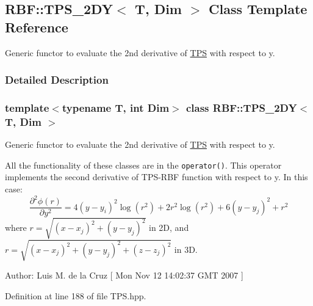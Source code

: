 \hypertarget{classRBF_1_1TPS__2DY}{
\subsection{RBF::TPS\_\-2DY$<$ T, Dim $>$ Class Template Reference}
\label{classRBF_1_1TPS__2DY}
}
Generic functor to evaluate the 2nd derivative of \hyperlink{classRBF_1_1TPS}{TPS} with respect to y.  




\subsubsection{Detailed Description}
\subsubsection*{template$<$typename T, int Dim$>$ class RBF::TPS\_\-2DY$<$ T, Dim $>$}

Generic functor to evaluate the 2nd derivative of \hyperlink{classRBF_1_1TPS}{TPS} with respect to y. 

All the functionality of these classes are in the {\tt operator()}. This operator implements the second derivative of TPS-RBF function with respect to y. In this case: \[ \frac{\partial^2 \phi(r)}{\partial y^2} = 4(y-y_i)^2\log(r^2) + 2r^2\log(r^2) + 6(y - y_j)^2 + r^2 \] where $ r = \sqrt{(x - x_j)^2 + (y - y_j)^2} $ in 2D, and $ r = \sqrt{(x - x_j)^2 + (y - y_j)^2 + (z - z_j)^2} $ in 3D.

\begin{Desc}
\item[Author:]Luis M. de la Cruz \mbox{[} Mon Nov 12 14:02:37 GMT 2007 \mbox{]} \end{Desc}


Definition at line 188 of file TPS.hpp.